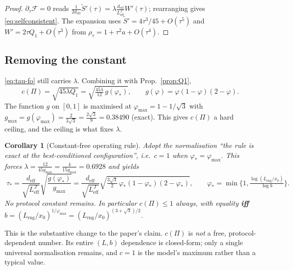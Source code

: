 \documentclass[11pt]{article}
\newtheorem{corollary}[theorem]{Corollary}
\theoremstyle{definition}
\newcommand{\deff}{d_{\mathrm{eff}}}
\newcommand{\Leff}{L_{\mathrm{eff}}^{J}}
\begin{document}
\begin{proof}
$\partial_\tau\mathcal F=0$ reads $\tfrac{1}{2\deff}\tilde S'(\tau)=\lambda\frac{\deff}{\Leff}W'(\tau)$;
rearranging gives \eqref{eq:selfconsistent}. The expansion uses $\tilde S'=4\tau^3/45+O(\tau^5)$ and
$W'=2\tau Q_1+O(\tau^3)$ from $\rho_\tau=1+\tau^2a+O(\tau^4)$.
\end{proof}

\subsection{Removing the constant}

\eqref{eq:tau-fo} still carries $\lambda$. Combining it with Prop.~\ref{prop:Q1},
\begin{equation}
c(\Pi)=\sqrt{45\lambda Q_1}=\sqrt{\tfrac{45\lambda}{12}\,g(\varphi_*)},
\qquad g(\varphi)=\varphi(1-\varphi)(2-\varphi).
\label{eq:c-closed}
\end{equation}
The function $g$ on $[0,1]$ is maximised at $\varphi_{\max}=1-1/\sqrt3$ with
$g_{\max}=g(\varphi_{\max})=\tfrac{2}{3\sqrt3}=\tfrac{2\sqrt3}{9}=0.38490$ (exact). This gives
$c(\Pi)$ a hard ceiling, and the ceiling is what fixes $\lambda$.

\begin{corollary}[Constant-free operating rule]\label{cor:zeroconst}
Adopt the normalisation ``the rule is exact at the best-conditioned configuration'',
i.e.\ $c=1$ when $\varphi_*=\varphi_{\max}$. This forces $\lambda=\tfrac{12}{45g_{\max}}=\tfrac{4}{15g_{\max}}=0.6928$ and yields
\begin{equation}
\boxed{\;\tau_*=\frac{\deff}{\sqrt{\Leff}}\sqrt{\frac{g(\varphi_*)}{g_{\max}}}
=\frac{\deff}{\sqrt{\Leff}}\sqrt{\tfrac{3\sqrt3}{2}\,\varphi_*(1-\varphi_*)(2-\varphi_*)},
\qquad \varphi_*=\min\Big\{1,\tfrac{\log(L_{\mathrm{rng}}/x_0)}{\log b}\Big\}. \;}
\label{eq:zeroconst}
\end{equation}
No protocol constant remains. In particular $c(\Pi)\le1$ always, with equality
\textbf{iff} $b=(L_{\mathrm{rng}}/x_0)^{1/\varphi_{\max}}=(L_{\mathrm{rng}}/x_0)^{(3+\sqrt3)/2}$.
\end{corollary}

This is the substantive change to the paper's claim. $c(\Pi)$ is \emph{not} a
free, protocol-dependent number. Its entire $(L,b)$ dependence is closed-form; only a single
universal normalisation remains, and $c{=}1$ is the model's maximum rather than a typical value.
\end{document}

